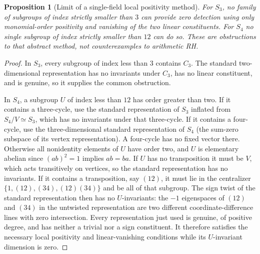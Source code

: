 \documentclass[11pt]{article}
\newtheorem{proposition}[theorem]{Proposition}
\theoremstyle{remark}\newtheorem{remark}[theorem]{Remark}
\begin{document}
\begin{proposition}[Limit of a single-field local positivity method]\label{prop:smallobs}
For $S_3$, no family of subgroups of index strictly smaller than $3$ can
provide zero detection using only monomial-order positivity and vanishing
of the two linear constituents. For $S_4$ no \emph{single} subgroup of index
strictly smaller than $12$ can do so. These are obstructions to that abstract
method, not counterexamples to arithmetic RH.
\end{proposition}
\begin{proof}
In $S_3$, every subgroup of index less than $3$ contains $C_3$. The standard
two-dimensional representation has no invariants under $C_3$, has no linear
constituent, and is genuine, so it supplies the common obstruction.

In $S_4$, a subgroup $U$ of index less than $12$ has order greater than two.
If it contains a three-cycle, use the standard representation of $S_3$ inflated
from $S_4/V\simeq S_3$, which has no invariants under that three-cycle. If it
contains a four-cycle, use the three-dimensional standard representation
of $S_4$ (the sum-zero subspace of its vertex representation). A four-cycle
has no fixed vector there. Otherwise all nonidentity elements of $U$ have
order two, and $U$ is elementary abelian since $(ab)^2=1$ implies $ab=ba$.
If $U$ has no transposition it must be $V$, which acts transitively on vertices,
so the standard representation has no invariants. If it contains a
transposition, say $(12)$, it must lie in the centralizer
$\{1,(12),(34),(12)(34)\}$ and be all of that subgroup. The sign twist of the
standard representation then has no $U$-invariants: the $-1$ eigenspaces
of $(12)$ and $(34)$ in the untwisted representation are two different
coordinate-difference lines with zero intersection. Every representation just
used is genuine, of positive degree, and has neither a trivial nor a sign
constituent. It therefore satisfies the necessary local positivity and
linear-vanishing conditions while its $U$-invariant dimension is zero.
\end{proof}
\end{document}
